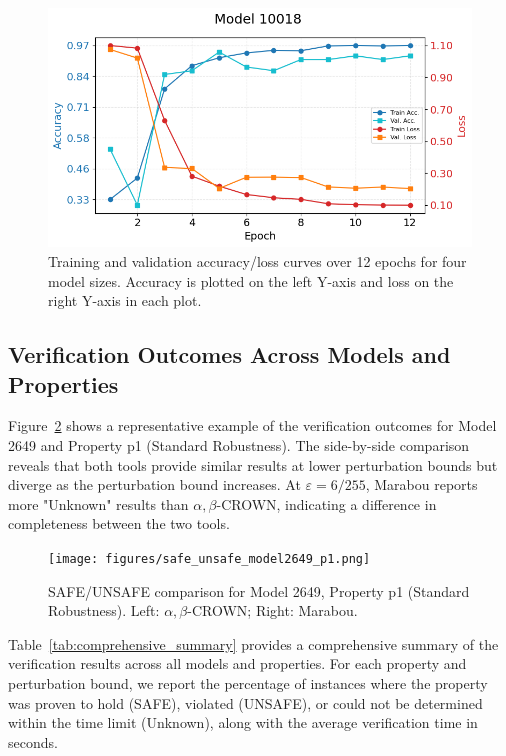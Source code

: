 \begin{figure}[ht]
\begin{minipage}{0.49\linewidth}
    \end{minipage}
    \hfill
    \begin{minipage}{0.49\linewidth}
        \centering
        \includegraphics[width=\linewidth]{figures/train_metrics10018.png}

    \end{minipage}
    \caption{Training and validation accuracy/loss curves over 12 epochs for four model sizes. Accuracy is plotted on the left Y-axis and loss on the right Y-axis in each plot.}
    \label{fig:training-metrics-all}
\end{figure}

\subsection{Verification Outcomes Across Models and Properties}

Figure~\ref{fig:safe_unsafe_model2649_p1} shows a representative example of the verification outcomes for Model 2649 and Property p1 (Standard Robustness). The side-by-side comparison reveals that both tools provide similar results at lower perturbation bounds but diverge as the perturbation bound increases. At $\varepsilon = 6/255$, Marabou reports more "Unknown" results than $\alpha, \beta$-CROWN, indicating a difference in completeness between the two tools.

\begin{figure}[htbp]
    \centering
    \texttt{[image: figures/safe\_unsafe\_model2649\_p1.png]}
    \caption{SAFE/UNSAFE comparison for Model 2649, Property p1 (Standard Robustness). Left: $\alpha, \beta$-CROWN; Right: Marabou.}
    \label{fig:safe_unsafe_model2649_p1}
\end{figure}

Table~\ref{tab:comprehensive_summary} provides a comprehensive summary of the verification results across all models and properties. For each property and perturbation bound, we report the percentage of instances where the property was proven to hold (SAFE), violated (UNSAFE), or could not be determined within the time limit (Unknown), along with the average verification time in seconds.

